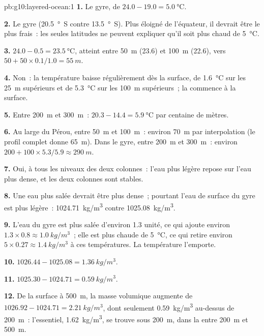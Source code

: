 \begin{solution}{pb:g10:layered-ocean:1}
\textbf{1.} Le gyre, de $24.0 - 19.0 = \qty{5.0}{\degreeCelsius}$.

\textbf{2.} Le gyre (\qty{20.5}{\degree S} contre \qty{13.5}{\degree S}).
Plus éloigné de l'équateur, il devrait être le plus frais~: les seules
latitudes ne peuvent expliquer qu'il soit plus chaud de
\qty{5}{\degreeCelsius}.

\textbf{3.} $24.0 - 0.5 = \qty{23.5}{\degreeCelsius}$, atteint entre
\qty{50}{m} (23.6) et \qty{100}{m} (22.6), vers $50 + 50 \times
0.1/1.0 = \qty{55}{m}$.

\textbf{4.} Non~: la température baisse régulièrement dès la surface, de
\qty{1.6}{\degreeCelsius} sur les \qty{25}{m} supérieurs et de
\qty{5.3}{\degreeCelsius} sur les \qty{100}{m} supérieurs~; la 
commence à la surface.

\textbf{5.} Entre \qty{200}{m} et \qty{300}{m}~: $20.3 - 14.4 =
\qty{5.9}{\degreeCelsius}$ par centaine de mètres.

\textbf{6.} Au large du Pérou, entre \qty{50}{m} et \qty{100}{m}~: environ
\qty{70}{m} par interpolation (le profil complet donne \qty{65}{m}). Dans le
gyre, entre \qty{200}{m} et \qty{300}{m}~: environ $200 + 100 \times 5.3/5.9
\approx \qty{290}{m}$.

\textbf{7.} Oui, à tous les niveaux des deux colonnes~: l'eau plus légère
repose sur l'eau plus dense, et les deux colonnes sont stables.

\textbf{8.} Une eau plus salée devrait être plus dense~; pourtant l'eau de
surface du gyre est plus légère~: \qty{1024.71}{kg/m^3} contre
\qty{1025.08}{kg/m^3}.

\textbf{9.} L'eau du gyre est plus salée d'environ 1.3 unité, ce qui ajoute
environ $1.3 \times 0.8 \approx \qty{1.0}{kg/m^3}$~; elle est plus chaude de
\qty{5}{\degreeCelsius}, ce qui retire environ $5 \times 0.27 \approx \qty{1.4}{kg/m^3}$ à ces
températures. La température l'emporte.

\textbf{10.} $1026.44 - 1025.08 = \qty{1.36}{kg/m^3}$.

\textbf{11.} $1025.30 - 1024.71 = \qty{0.59}{kg/m^3}$.

\textbf{12.} De la surface à \qty{500}{m}, la masse volumique augmente de
$1026.92 - 1024.71 = \qty{2.21}{kg/m^3}$, dont seulement \qty{0.59}{kg/m^3}
au-dessus de \qty{200}{m}~: l'essentiel, \qty{1.62}{kg/m^3}, se trouve sous
\qty{200}{m}, dans la  entre \qty{200}{m} et \qty{500}{m}.


\end{solution}
